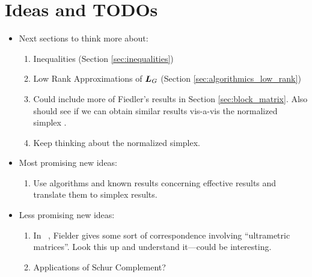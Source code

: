 \section{Ideas and TODOs}
\begin{itemize}
	\item Next sections to think more about: 
	\begin{enumerate}
		\item Inequalities (Section \ref{sec:inequalities}) 
		\item Low Rank Approximations of $\vb*{L}_G$ (Section \ref{sec:algorithmics_low_rank})
		\item Could include more of Fiedler's results in Section \ref{sec:block_matrix}. Also should see if we can obtain  similar results vis-a-vis the normalized simplex . 
		\item Keep thinking about the normalized simplex. 
	\end{enumerate}
\item Most promising new ideas: 
\begin{enumerate}
	\item Use algorithms and known results concerning effective results and translate them to simplex results. 
\end{enumerate}
\item Less promising new ideas: 
\begin{enumerate}
	\item  In ~\cite{fiedler1998some}, Fielder gives some sort of correspondence involving ``ultrametric matrices''. Look this up and understand it---could be interesting. 
	\item Applications of Schur Complement? 
\end{enumerate}
\end{itemize}







     

  	
